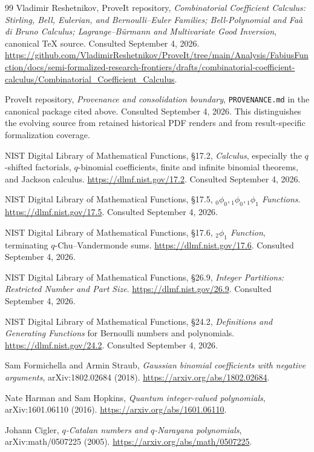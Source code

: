 \documentclass[11pt,a4paper]{article}
\numberwithin{equation}{section}
\theoremstyle{definition}
\theoremstyle{remark}
\begin{document}
\begin{thebibliography}{99}
Vladimir Reshetnikov, ProveIt repository,
\emph{Combinatorial Coefficient Calculus: Stirling, Bell, Eulerian, and
Bernoulli--Euler Families; Bell-Polynomial and Fa\`a di Bruno Calculus;
Lagrange--B\"urmann and Multivariate Good Inversion}, canonical \TeX{} source.
Consulted September 4, 2026.
\url{https://github.com/VladimirReshetnikov/ProveIt/tree/main/Analysis/FabiusFunction/docs/semi-formalized-research-frontiers/drafts/combinatorial-coefficient-calculus/Combinatorial_Coefficient_Calculus}.

ProveIt repository, \emph{Provenance and consolidation boundary},
\texttt{PROVENANCE.md} in the canonical package cited above.
Consulted September 4, 2026. This distinguishes the evolving source from retained
historical PDF renders and from result-specific formalization coverage.

NIST Digital Library of Mathematical Functions, \S17.2,
\emph{Calculus}, especially the $q$-shifted factorials, $q$-binomial coefficients,
finite and infinite binomial theorems, and Jackson calculus.
\url{https://dlmf.nist.gov/17.2}. Consulted September 4, 2026.

NIST Digital Library of Mathematical Functions, \S17.5,
\emph{$ {}_0\phi_0,{}_1\phi_0,{}_1\phi_1$ Functions}.
\url{https://dlmf.nist.gov/17.5}. Consulted September 4, 2026.

NIST Digital Library of Mathematical Functions, \S17.6,
\emph{$ {}_2\phi_1$ Function}, terminating $q$-Chu--Vandermonde sums.
\url{https://dlmf.nist.gov/17.6}. Consulted September 4, 2026.

NIST Digital Library of Mathematical Functions, \S26.9,
\emph{Integer Partitions: Restricted Number and Part Size}.
\url{https://dlmf.nist.gov/26.9}. Consulted September 4, 2026.

NIST Digital Library of Mathematical Functions, \S24.2,
\emph{Definitions and Generating Functions} for Bernoulli numbers and polynomials.
\url{https://dlmf.nist.gov/24.2}. Consulted September 4, 2026.

Sam Formichella and Armin Straub,
\emph{Gaussian binomial coefficients with negative arguments},
arXiv:1802.02684 (2018).
\url{https://arxiv.org/abs/1802.02684}.

Nate Harman and Sam Hopkins,
\emph{Quantum integer-valued polynomials},
arXiv:1601.06110 (2016).
\url{https://arxiv.org/abs/1601.06110}.

Johann Cigler,
\emph{$q$-Catalan numbers and $q$-Narayana polynomials},
arXiv:math/0507225 (2005).
\url{https://arxiv.org/abs/math/0507225}.
\end{thebibliography}
\end{document}
